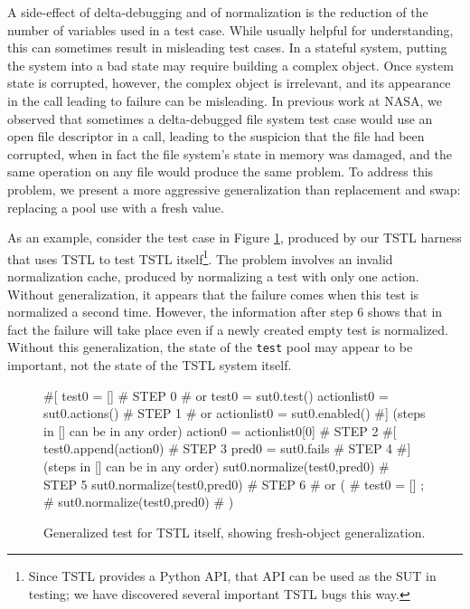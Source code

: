 A side-effect of delta-debugging and of normalization is the reduction
of the number of variables used in a test case.  While usually helpful
for understanding, this can sometimes result in misleading test
cases.  In a stateful system, putting the system into a bad state may require
building a complex object.  Once system state is corrupted, however,
the complex object is irrelevant, and its appearance in the call
leading to failure can be misleading.  In previous work at NASA, we
observed that sometimes a delta-debugged file system test case
\cite{ICSEDiff,AMAI} would use an open file descriptor in a call,
leading to the suspicion that the file had been corrupted, when in
fact the file system's state in memory was damaged, and the same
operation on any file would produce the same problem.  To address this
problem, we present a more aggressive generalization than
replacement and swap:  replacing a pool use with a
fresh value.  

As an example, consider the test case in Figure \ref{fig:mislead},
produced by our TSTL harness that uses TSTL to test TSTL
itself\footnote{Since TSTL provides a Python API, that API can be used
  as the SUT in testing; we have discovered several important TSTL
  bugs this way.}.  The problem involves an invalid normalization
cache, produced by normalizing a test with only one action.  Without
generalization, it appears that the failure comes when this test is
normalized a second time.  However, the information after step 6 shows
that in fact the failure will take place even if a newly created empty test is
normalized.  Without this generalization, the state of the {\tt test} pool
may appear to be important, not the state of the TSTL system itself.

\begin{figure}
{\scriptsize
\begin{code}
\textcolor{black!45}{\#[}
test0 = []                             \textcolor{black!45}{\# STEP 0}
\textcolor{black!45}{\#  or test0 = sut0.test() }
actionlist0 = sut0.actions()           \textcolor{black!45}{\# STEP 1}
\textcolor{black!45}{\#  or actionlist0 = sut0.enabled() }
\textcolor{black!45}{\#] (steps in [] can be in any order)}
action0 = actionlist0[0]               \textcolor{black!45}{\# STEP 2}
\textcolor{black!45}{\#[}
test0.append(action0)                  \textcolor{black!45}{\# STEP 3}
pred0 = sut0.fails                     \textcolor{black!45}{\# STEP 4}
\textcolor{black!45}{\#] (steps in [] can be in any order)}
sut0.normalize(test0,pred0)            \textcolor{black!45}{\# STEP 5}
sut0.normalize(test0,pred0)            \textcolor{black!45}{\# STEP 6}
\textcolor{black!45}{\#  or (}
\textcolor{black!45}{\#      test0 = []  ;}
\textcolor{black!45}{\#      sut0.normalize(test0,pred0) }
\textcolor{black!45}{\#     )}
\end{code}
}
\caption{Generalized test for TSTL itself, showing fresh-object
  generalization.}
\label{fig:mislead}
\end{figure}

